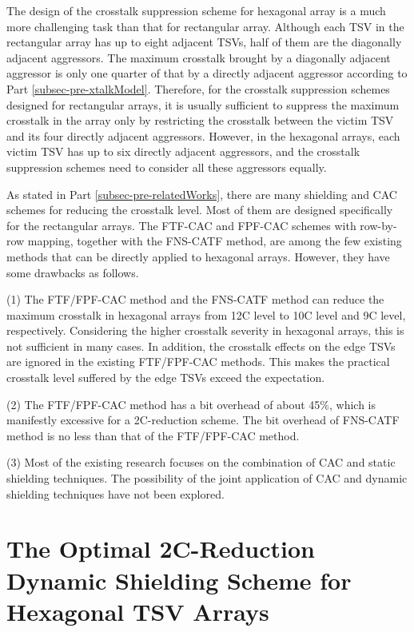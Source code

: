 \documentclass[lettersize,journal]{IEEEtran}
\begin{document}
The design of the crosstalk suppression scheme for hexagonal array is a much more challenging task than that for rectangular array. Although each TSV in the rectangular array has up to eight adjacent TSVs, half of them are the diagonally adjacent aggressors. The maximum crosstalk brought by a diagonally adjacent aggressor is only one quarter of that by a directly adjacent aggressor according to Part \ref{subsec-pre-xtalkModel}. Therefore, for the crosstalk suppression schemes designed for rectangular arrays, it is usually sufficient to suppress the maximum crosstalk in the array only by restricting the crosstalk between the victim TSV and its four directly adjacent aggressors. However, in the hexagonal arrays, each victim TSV has up to six directly adjacent aggressors, and the crosstalk suppression schemes need to consider all these aggressors equally. 

As stated in Part \ref{subsec-pre-relatedWorks}, there are many shielding and CAC schemes for reducing the crosstalk level. Most of them are designed specifically for the rectangular arrays. The FTF-CAC and FPF-CAC schemes with row-by-row mapping, together with the FNS-CATF method, are among the few existing methods that can be directly applied to hexagonal arrays. However, they have some drawbacks as follows. 

(1)	The FTF/FPF-CAC method and the FNS-CATF method can reduce the maximum crosstalk in hexagonal arrays from 12C level to 10C level and 9C level, respectively. Considering the higher crosstalk severity in hexagonal arrays, this is not sufficient in many cases. In addition, the crosstalk effects on the edge TSVs are ignored in the existing FTF/FPF-CAC methods. This makes the practical crosstalk level suffered by the edge TSVs exceed the expectation.

(2)	The FTF/FPF-CAC method has a bit overhead of about 45\%, which is manifestly excessive for a 2C-reduction scheme. The bit overhead of FNS-CATF method is no less than that of the FTF/FPF-CAC method. 
 
(3)	Most of the existing research focuses on the combination of CAC and static shielding techniques. The possibility of the joint application of CAC and dynamic shielding techniques have not been explored. 


\section{The Optimal 2C-Reduction Dynamic Shielding Scheme for Hexagonal TSV Arrays}\label{sec-dysh}
\end{document}
